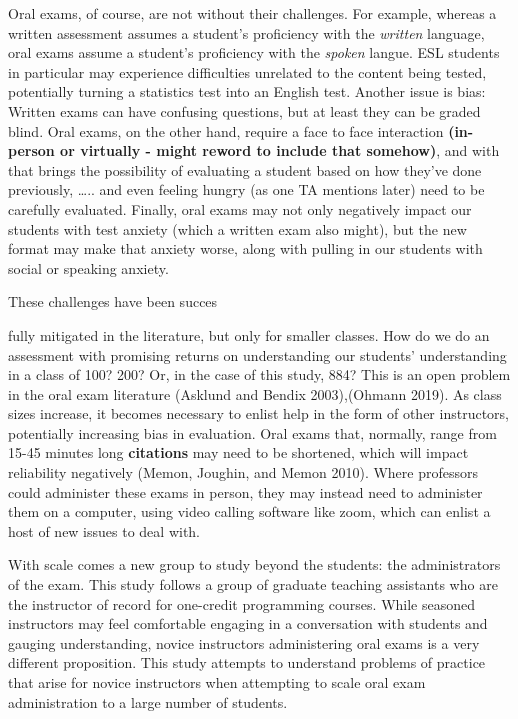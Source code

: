\documentclass[
  letterpaper,
  DIV=11,
  numbers=noendperiod]{scrartcl}
\begin{document}
Oral exams, of course, are not without their challenges. For example,
whereas a written assessment assumes a student's proficiency with the
\emph{written} language, oral exams assume a student's proficiency with
the \emph{spoken} langue. ESL students in particular may experience
difficulties unrelated to the content being tested, potentially turning
a statistics test into an English test. Another issue is bias: Written
exams can have confusing questions, but at least they can be graded
blind. Oral exams, on the other hand, require a face to face interaction
\textbf{(in-person or virtually - might reword to include that
somehow)}, and with that brings the possibility of evaluating a student
based on how they've done previously, \ldots.. and even feeling hungry
(as one TA mentions later) need to be carefully evaluated. Finally, oral
exams may not only negatively impact our students with test anxiety
(which a written exam also might), but the new format may make that
anxiety worse, along with pulling in our students with social or
speaking anxiety.

These challenges have been succes

fully mitigated in the literature, but only for smaller classes. How do
we do an assessment with promising returns on understanding our
students' understanding in a class of 100? 200? Or, in the case of this
study, 884? This is an open problem in the oral exam literature (Asklund
and Bendix 2003),(Ohmann 2019). As class sizes increase, it becomes
necessary to enlist help in the form of other instructors, potentially
increasing bias in evaluation. Oral exams that, normally, range from
15-45 minutes long \textbf{citations} may need to be shortened, which
will impact reliability negatively (Memon, Joughin, and Memon 2010).
Where professors could administer these exams in person, they may
instead need to administer them on a computer, using video calling
software like zoom, which can enlist a host of new issues to deal with.

With scale comes a new group to study beyond the students: the
administrators of the exam. This study follows a group of graduate
teaching assistants who are the instructor of record for one-credit
programming courses. While seasoned instructors may feel comfortable
engaging in a conversation with students and gauging understanding,
novice instructors administering oral exams is a very different
proposition. This study attempts to understand problems of practice that
arise for novice instructors when attempting to scale oral exam
administration to a large number of students.
\end{document}
